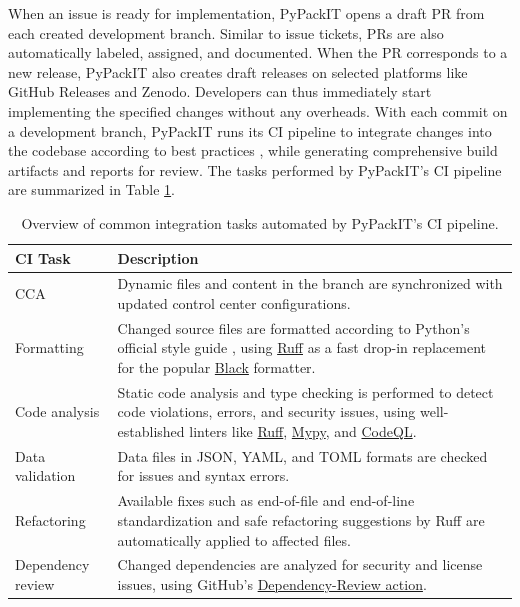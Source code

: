 \documentclass{article}
\begin{document}
When an issue is ready for implementation, PyPackIT opens a draft PR from each created development branch. Similar to issue tickets, PRs are also automatically labeled, assigned, and documented. When the PR corresponds to a new release, PyPackIT also creates draft releases on selected platforms like GitHub Releases and Zenodo. Developers can thus immediately start implementing the specified changes without any overheads. With each commit on a development branch, PyPackIT runs its CI pipeline to integrate changes into the codebase according to best practices \cite{CICDSystematicReview, ModelingCI, ContinuousSoftEng}, while generating comprehensive build artifacts and reports for review. The tasks performed by PyPackIT's CI pipeline are summarized in Table \ref{table:ci-tasks}. 

\begin{table}[h!]
\centering
\caption{Overview of common integration tasks automated by PyPackIT's CI pipeline.}
\label{table:ci-tasks}
\begin{tabularx}{\textwidth}{p{} X}
\toprule
\rowcolor{white} \textbf{CI Task} & \textbf{Description} \\
\midrule
CCA & Dynamic files and content in the branch are synchronized with updated control center configurations.\\

Formatting & Changed source files are formatted according to Python's official style guide \cite{PEP8}, using \href{https://docs.astral.sh/ruff/}{Ruff} as a fast drop-in replacement for the popular \href{https://black.readthedocs.io/}{Black} formatter.\\

Code analysis & Static code analysis and type checking is performed to detect code violations, errors, and security issues, using well-established linters like \href{https://docs.astral.sh/ruff/}{Ruff}, \href{https://mypy.readthedocs.io/}{Mypy}, and \href{https://codeql.github.com/}{CodeQL}. \\

Data validation & Data files in JSON, YAML, and TOML formats are checked for issues and syntax errors. \\

Refactoring & Available fixes such as end-of-file and end-of-line standardization and safe refactoring suggestions by Ruff are automatically applied to affected files.\\

Dependency review & Changed dependencies are analyzed for security and license issues, using GitHub's \href{https://github.com/actions/dependency-review-action}{Dependency-Review action}. \\


\end{tabularx}
\end{table}
\end{document}
